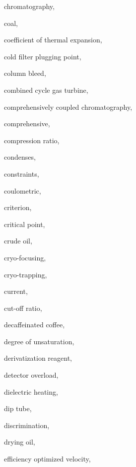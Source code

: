 \begin{theindex}
  \item \lowercase {chromatography}, 
  \item \lowercase {coal}, 
  \item \lowercase {coefficient of thermal expansion}, 
  \item \lowercase {cold filter plugging point}, 
  \item \lowercase {column bleed}, 
  \item \lowercase {combined cycle gas turbine}, 
  \item \lowercase {comprehensively coupled chromatography}, 
  \item \lowercase {comprehensive}, 
  \item \lowercase {compression ratio}, 
  \item \lowercase {condenses}, 
  \item \lowercase {constraints}, 
  \item \lowercase {coulometric}, 
  \item \lowercase {criterion}, 
  \item \lowercase {critical point}, 
  \item \lowercase {crude oil}, 
  \item \lowercase {cryo-focusing}, 
  \item \lowercase {cryo-trapping}, 
  \item \lowercase {current}, 
  \item \lowercase {cut-off ratio}, 
  \item \lowercase {decaffeinated coffee}, 
  \item \lowercase {degree of unsaturation}, 
  \item \lowercase {derivatization reagent}, 
  \item \lowercase {detector overload}, 
  \item \lowercase {dielectric heating}, 
  \item \lowercase {dip tube}, 
  \item \lowercase {discrimination}, 
  \item \lowercase {drying oil}, 
  \item \lowercase {efficiency optimized velocity}, 

\end{theindex}

